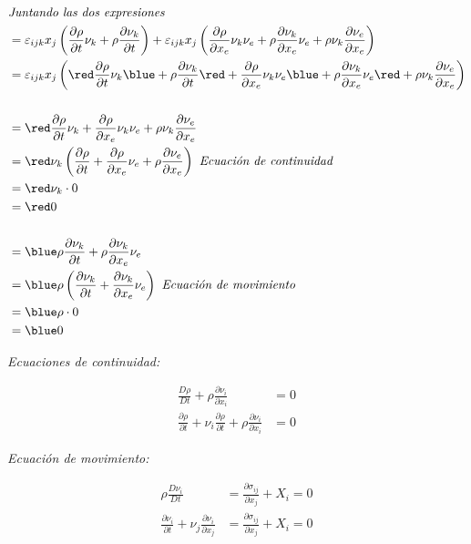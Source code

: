 \documentclass[a4paper,10pt,twoside,final,spanish]{article}
\begin{document}
\begin{align*}
& \textit{Juntando las dos expresiones} \\
&= \varepsilon_{ijk}x_{j}\left(\frac{\partial\rho}{\partial t}\nu_{k}
+\rho\frac{\partial\nu_{k}}{\partial t}\right)
+\varepsilon_{ijk}x_{j}\left(\frac{\partial\rho}{\partial x_{e}}\nu_{k}\nu_{e}
+\rho\frac{\partial\nu_{k}}{\partial x_{e}}\nu_{e}
+\rho\nu_{k}\frac{\partial\nu_{e}}{\partial x_{e}}\right) \\
&= \varepsilon_{ijk}x_{j}\left({\red \frac{\partial\rho}{\partial t}\nu_{k}}
{\blue +\rho\frac{\partial\nu_{k}}{\partial t}}
{\red +\frac{\partial\rho}{\partial x_{e}}\nu_{k}\nu_{e}}
{\blue +\rho\frac{\partial\nu_{k}}{\partial x_{e}}\nu_{e}}
{\red +\rho\nu_{k}\frac{\partial\nu_{e}}{\partial x_{e}}}\right) \\ \\
&= {\red \frac{\partial\rho}{\partial t}\nu_{k}
+\frac{\partial\rho}{\partial x_{e}}\nu_{k}\nu_{e}
+\rho\nu_{k}\frac{\partial\nu_{e}}{\partial x_{e}}} \\
&= {\red \nu_{k}\left(\frac{\partial\rho}{\partial t}
+\frac{\partial\rho}{\partial x_{e}}\nu_{e}
+\rho\frac{\partial\nu_{e}}{\partial x_{e}}\right) \textit{ Ecuación de continuidad}} \\
&= {\red \nu_{k}\cdot 0} \\
&= {\red 0} \\ \\
&= {\blue \rho\frac{\partial\nu_{k}}{\partial t}
+\rho\frac{\partial\nu_{k}}{\partial x_{e}}\nu_{e}} \\
&= {\blue \rho\left(\frac{\partial\nu_{k}}{\partial t}
+\frac{\partial\nu_{k}}{\partial x_{e}}\nu_{e}\right) \textit{ Ecuación de movimiento}} \\
&= {\blue \rho\cdot 0} \\
&= {\blue 0}
\end{align*}

\textit{Ecuaciones de continuidad:}

\begin{align*}
\frac{D\rho}{Dt}+\rho\frac{\partial\nu_{i}}{\partial x_{i}} &= 0 \\
\frac{\partial\rho}{\partial t}+\nu_{i}\frac{\partial\rho}{\partial t}
+\rho\frac{\partial\nu_{i}}{\partial x_{i}} &= 0 
\end{align*}

\textit{Ecuación de movimiento:}

\begin{align*}
\rho\frac{D\nu_{i}}{Dt} &= \frac{\partial\sigma_{ij}}{\partial x_{j}}+X_{i}=0 \\
\frac{\partial\nu_{i}}{\partial t}+\nu_{j}\frac{\partial\nu_{i}}{\partial x_{j}}
&= \frac{\partial\sigma_{ij}}{\partial x_{j}}+X_{i}=0
\end{align*}
\end{document}
